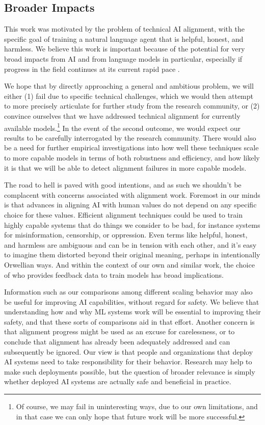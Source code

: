 \subsection{Broader Impacts}

This work was motivated by the problem of technical AI alignment, with the specific goal of  training a natural language agent that is helpful, honest, and harmless.  We believe this work is important because of the potential for very broad impacts from AI and from language models in particular, especially if progress in the field continues at its current rapid pace \cite{bowman2021combating}.  

We hope that by directly approaching a general and ambitious problem, we will either (1) fail due to specific technical challenges, which we would then attempt to more precisely articulate for further study from the research community, or (2) convince ourselves that we have addressed technical alignment for currently available models.\footnote{Of course, we may fail in uninteresting ways, due to our own limitations, and in that case we can only hope that future work will be more successful.}   In the event of the second outcome, we would expect our results to be carefully interrogated by the research community. There would also be a need for further empirical investigations into how well these techniques scale to more capable models in terms of both robustness and efficiency, and how likely it is that we will be able to detect alignment failures in more capable models.

The road to hell is paved with good intentions, and as such we shouldn't be complacent with concerns associated with alignment work.  Foremost in our minds is that advances in aligning AI with human values do not depend on any specific choice for these values.  Efficient alignment techniques could be used to train highly capable systems that do things we consider to be bad, for instance systems for misinformation, censorship, or oppression.  Even terms like helpful, honest, and harmless are  ambiguous and can be in tension with each other, and it's easy to imagine them  distorted beyond their original meaning, perhaps in intentionally Orwellian ways.  And within the context of our own and similar work, the choice of who provides feedback data to train models has broad implications. 

Information such as our comparisons among different scaling behavior may also be useful for improving AI capabilities, without regard for safety.  We believe that understanding how and why ML systems work will be essential to improving their safety, and that these sorts of comparisons aid in that effort.  Another concern is that alignment progress might be used as an excuse for carelessness, or to conclude that alignment has already been adequately addressed and can subsequently be ignored.  Our view is that people and organizations that deploy AI systems need to take responsibility for their behavior.  Research may help to make such deployments possible, but the question of broader relevance is simply whether deployed AI systems are actually safe and beneficial in practice.  

